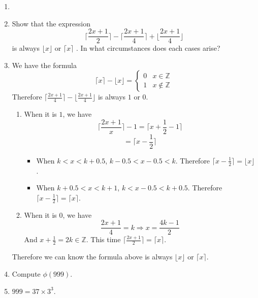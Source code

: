 \documentclass[12pt,a4paper]{article}
\makeatletter
\newtheorem*{solution}{Solution}
\theoremstyle{definition}
\renewenvironment{solution}[1][Solution] {\par\pushQED{\qed}\normalfont\topsep6\p@\@plus6\p@\relax\trivlist\item[\hskip\labelsep\bfseries#1\@addpunct{.}]\ignorespaces}{\popQED\endtrivlist\@endpefalse} \makeatother
\makeatother
\begin{document}
\begin{enumerate}
\begin{solution}
        \end{solution}
    \item 
        Show that the expression 
        \begin{equation*}
            \lceil \frac{2x+1}{2} \rceil-\lceil \frac{2x+1}{4} \rceil +\lfloor \frac{2x+1}{4} \rfloor
        \end{equation*}
        is always $\lfloor x \rfloor$ or $\lceil x \rceil$ . In what circumstances does each cases arise?
    \begin{solution}
        We have the formula
        \begin{equation*}
            \lceil x \rceil - \lfloor x \rfloor=
            \begin{cases}
                0&x\in \mathbb{Z}\\
                1&x\notin \mathbb{Z}
            \end{cases}
        \end{equation*}
        Therefore $\lceil \frac{2x+1}{4} \rceil -\lfloor \frac{2x+1}{4} \rfloor$ is always $1$ or $0$.
        \begin{enumerate}
            \item When it is $1$, we have 
            \begin{equation*}
                \lceil \frac{2x+1}{x} \rceil-1=\lceil x+\frac{1}{2}-1 \rceil
            \end{equation*}
            \begin{equation*}
                =\lceil x-\frac{1}{2} \rceil
            \end{equation*}
            \begin{itemize}
                \item When $k<x<k+0.5$, $k-0.5<x-0.5<k$. Therefore $\lceil x-\frac{1}{2} \rceil=\lfloor x \rfloor $.
                \item When $k+0.5<x<k+1$, $k<x-0.5<k+0.5$. Therefore $\lceil x-\frac{1}{2} \rceil=\lceil x \rceil$.
            \end{itemize}
            \item When it is $0$, we have
            \begin{equation*}
                \frac{2x+1}{4}=k \Rightarrow x=\frac{4k-1}{2}
            \end{equation*}
            And $x+\frac{1}{2}=2k\in \mathbb{Z}$. This time $\lceil \frac{2x+1}{2} \rceil=\lceil x \rceil $.
        \end{enumerate}
        Therefore we can know the formula above is always $\lfloor x \rfloor$ or $\lceil x \rceil$.
    \end{solution}
    \item 
    Compute $\phi(999)$.
    \begin{solution}
	    	$999=37\times3^3$.
	    	

\end{solution}
\end{enumerate}
\end{document}
